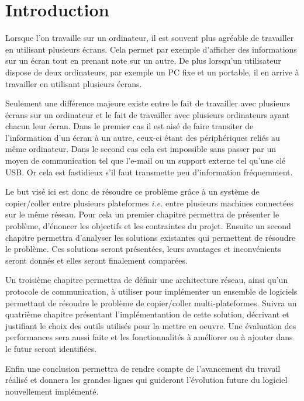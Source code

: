 \chapter*{Introduction}
\renewcommand{\leftmark}{INTRODUCTION}

Lorsque l'on travaille sur un ordinateur, il est souvent plus agréable
de travailler en utilisant plusieurs écrans. Cela permet par exemple
d'afficher des informations sur un écran tout en prenant note sur un autre.
De plus lorsqu'un utilisateur dispose de deux ordinateurs, par exemple
un PC fixe et un portable, il en arrive à travailler en utilisant plusieurs
écrans.

Seulement une différence majeure existe entre le fait de travailler
avec plusieurs écrans sur un ordinateur et le fait de travailler avec
plusieurs ordinateurs ayant chacun leur écran. Dans le premier cas il est
aisé de faire transiter de l'information d'un écran à un autre, ceux-ci
étant des périphériques reliés au même ordinateur. Dans le second cas
cela est impossible sans passer par un moyen de communication tel que l'e-mail
ou un support externe tel qu'une clé USB. Or cela est fastidieux
s'il faut transmette peu d'information fréquemment.

Le but visé ici est donc de résoudre ce problème grâce
à un système de copier/coller entre plusieurs plateformes \emph{i.e.} entre
plusieurs machines connectées sur le même réseau.
Pour cela un premier chapitre permettra de présenter le problème, d'énoncer
les objectifs et les contraintes du projet. Ensuite un second chapitre
permettra d'analyser les solutions existantes qui permettent de résoudre
le problème. Ces solutions seront présentées, leurs avantages et inconvénients
seront donnés et elles seront finalement comparées.

Un troisième chapitre
permettra de définir une architecture réseau, ainsi qu'un protocole de
communication, à utiliser pour implémenter un ensemble de logiciels
permettant de résoudre le problème de copier/coller multi-plateformes.
Suivra un quatrième chapitre présentant l'implémentantion de cette solution,
décrivant et justifiant le choix des outils utilisés pour la mettre en
oeuvre. Une évaluation des performances sera aussi faite et les
fonctionnalités à améliorer ou à ajouter dans le futur seront identifiées.

Enfin une conclusion permettra de rendre compte de l'avancement du travail
réalisé et donnera les grandes lignes qui guideront l'évolution future
du logiciel nouvellement implémenté.